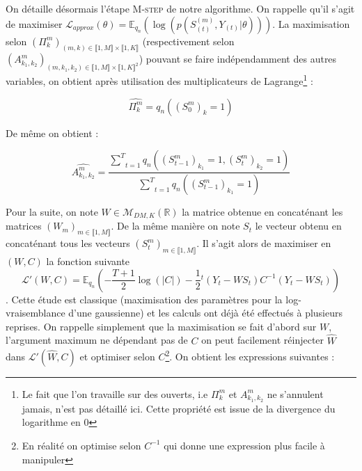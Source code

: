 \documentclass[10pt,a4paper]{article}
\newcommand{\Mstep}{\textsc{M-step}}
\begin{document}
On détaille désormais l'étape \Mstep{} de notre algorithme.
On rappelle qu'il s'agit de maximiser
$\mathcal{L}_{approx}(\theta)=\mathbb{E}_{q_n}
\left( \log \left( p(S_{(t)}^{(m)},Y_{(t)}\vert \theta)\right)\right)$.
La maximisation selon
$(\Pi_{k}^m)_{(m,k) \in
\llbracket 1,M \rrbracket \times \llbracket 1,K \rrbracket}$
(respectivement selon
$(A_{k_1,k_2}^m)_{(m,k_1,k_2) \in
\llbracket 1,M \rrbracket \times \llbracket 1,K \rrbracket^2}$) pouvant se faire 
indépendamment des autres variables, on obtient après utilisation des 
multiplicateurs de Lagrange\footnote{Le fait que l'on travaille sur des 
ouverts, i.e $\Pi_{k}^m$ et $A_{k_1,k_2}^m$ ne s'annulent jamais, n'est pas 
détaillé ici. Cette propriété est issue de la divergence du logarithme en $0$} :

\begin{equation}
  \widehat{\Pi_k^m}=q_{n}((S_0^m)_k=1)
\end{equation}

De même on obtient :

\begin{equation}
  \widehat{A_{k_1,k_2}^m}=\frac{\underset{t=1}{\overset{T}{\sum}}q_n((S_{t-1}^m)_{
  k_1}=1,(S_t^m)_{k_2}=1)}{\underset{t=1}{\overset{T}{\sum}}q_n((S_{t-1}^m)_{k_1}
  =1)}
\end{equation}

  Pour la suite, on note $W \in \mathcal{M}_{DM,K}(\mathbb{R})$ la matrice 
obtenue en concaténant les matrices $(W_m)_{m \in \llbracket 1,M \rrbracket}$. 
De la même manière on note $S_t$ le vecteur obtenu en concaténant tous les 
vecteurs $(S_t^m)_{m \in \llbracket 1,M \rrbracket}$.
Il s'agit alors de maximiser en $(W,C)$ la fonction suivante 
\[ \mathcal{L}'(W,C)=\mathbb{E}_{q_n}\left(-\frac{T+1}{2} \log(\vert C \vert) 
-\frac{1}{2} {}^t\left(Y_t-WS_t \right)C^{-1} \left( Y_t-WS_t\right)\right) \].
Cette étude est classique (maximisation des paramètres pour la 
log-vraisemblance d'une gaussienne) et les calculs ont déjà été effectués à 
plusieurs reprises.
On rappelle simplement que la maximisation se fait d'abord sur $W$, l'argument
maximum ne dépendant pas de $C$ on peut facilement réinjecter
$\widehat{W}$ dans $\mathcal{L}'(\widehat{W},C)$ et optimiser selon
$C$\footnote{En réalité on optimise selon $C^{-1}$ qui donne une 
expression plus facile à manipuler}.
On obtient les expressions suivantes :
\end{document}
